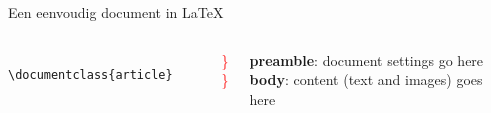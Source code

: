 \copyrightTim

\begin{frame}[fragile, t]{Een eenvoudig document in \LaTeX}
	\begin{columns}[t]
        \begin{column}{0.5\textwidth}
			\vspace{-20pt}
	\begin{verbatim} 
	\documentclass{article}


	
	







	
	\end{verbatim}

	\phantom{\tiny
	Example text: ``Elementary Illustrations of the Differential and Integral Calculus''
	by Augustus De Morgan
	}\par
\end{column}
\begin{column}{0.05\textwidth}
	\vspace{0pt}

	{\Huge \textcolor{red}{ \} } }\\[1.5cm]
	{\Huge \textcolor{red}{ \} } }
\end{column}
\begin{column}{0.4\textwidth}
	\vspace{0pt}

	\leavevmode\textbf{preamble}: document settings go here\\[1.5cm]
	\textbf{body}: content (text and images) goes here
\end{column}
\end{columns}

\end{frame}